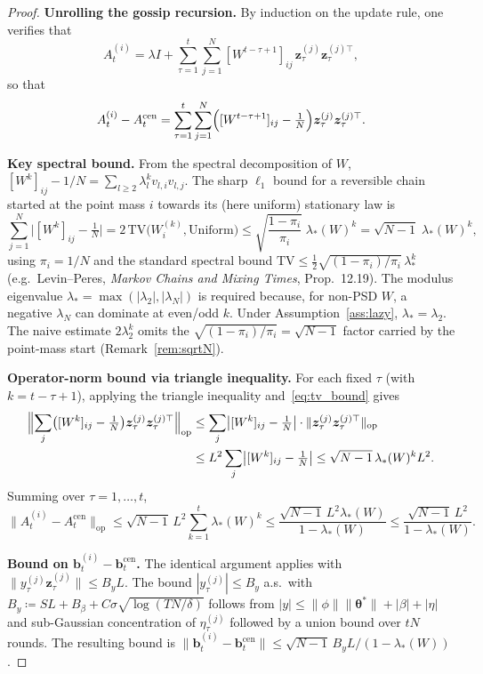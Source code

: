 \documentclass[11pt]{article}
\begin{document}
\begin{proof}
\textbf{Unrolling the gossip recursion.}
By induction on the update rule, one verifies that
\[
A_t^{(i)}=\lambda I+\sum_{\tau=1}^t\sum_{j=1}^N
[W^{t-\tau+1}]_{ij}\,\bm{z}_\tau^{(j)}\bm{z}_\tau^{(j)\top},
\]
so that
\[
A_t^{(i)}-A_t^{\mathrm{cen}}
=\sum_{\tau=1}^t\sum_{j=1}^N
\Bigl([W^{t-\tau+1}]_{ij}-\tfrac{1}{N}\Bigr)
\bm{z}_\tau^{(j)}\bm{z}_\tau^{(j)\top}.
\]

\textbf{Key spectral bound.}
From the spectral decomposition of $W$,
$[W^k]_{ij}-1/N=\sum_{l\geq 2}\lambda_l^k v_{l,i}v_{l,j}$.
The sharp $\ell_1$ bound for a reversible chain started at the point
mass $i$ towards its (here uniform) stationary law is
\begin{equation}
\sum_{j=1}^N\bigl|[W^k]_{ij}-\tfrac{1}{N}\bigr|
=2\,\mathrm{TV}\!\bigl(W_i^{(k)},\mathrm{Uniform}\bigr)
\leq\sqrt{\frac{1-\pi_i}{\pi_i}}\;\lambda_*(W)^k
=\sqrt{N-1}\;\lambda_*(W)^k,
\label{eq:tv_bound}
\end{equation}
using $\pi_i=1/N$ and the standard spectral bound
$\mathrm{TV}\leq\tfrac12\sqrt{(1-\pi_i)/\pi_i}\,\lambda_*^k$ (e.g.\
Levin--Peres, \emph{Markov Chains and Mixing Times}, Prop.~12.19).
The modulus eigenvalue $\lambda_*=\max(|\lambda_2|,|\lambda_N|)$ is
required because, for non-PSD $W$, a negative $\lambda_N$ can dominate
at even/odd $k$. Under Assumption~\ref{ass:lazy}, $\lambda_*=\lambda_2$.
The naive estimate $2\lambda_2^k$ omits the
$\sqrt{(1-\pi_i)/\pi_i}=\sqrt{N-1}$ factor carried by the point-mass
start (Remark~\ref{rem:sqrtN}).

\textbf{Operator-norm bound via triangle inequality.}
For each fixed $\tau$ (with $k=t-\tau+1$), applying the triangle
inequality and~\eqref{eq:tv_bound} gives
\begin{align*}
\Bigl\|\sum_{j}\bigl([W^k]_{ij}-\tfrac{1}{N}\bigr)
\bm{z}_\tau^{(j)}\bm{z}_\tau^{(j)\top}\Bigr\|_{\mathrm{op}}
&\leq\sum_{j}\bigl|[W^k]_{ij}-\tfrac{1}{N}\bigr|\cdot
\|\bm{z}_\tau^{(j)}\bm{z}_\tau^{(j)\top}\|_{\mathrm{op}}\\
&\leq L^2\sum_{j}\bigl|[W^k]_{ij}-\tfrac{1}{N}\bigr|
\leq\sqrt{N-1}\,\lambda_*(W)^k L^2.
\end{align*}
Summing over $\tau=1,\dots,t$,
\[
\|A_t^{(i)}-A_t^{\mathrm{cen}}\|_{\mathrm{op}}
\leq\sqrt{N-1}\,L^2\sum_{k=1}^t\lambda_*(W)^k
\leq\frac{\sqrt{N-1}\,L^2\lambda_*(W)}{1-\lambda_*(W)}
\leq\frac{\sqrt{N-1}\,L^2}{1-\lambda_*(W)}.
\]

\textbf{Bound on $\bm{b}_t^{(i)}-\bm{b}_t^{\mathrm{cen}}$.}
The identical argument applies with
$\|y_\tau^{(j)}\bm{z}_\tau^{(j)}\|\leq B_y L$.
The bound $|y_\tau^{(j)}|\leq B_y$ a.s.\ with
$B_y\coloneqq SL+B_\beta+C\sigma\sqrt{\log(TN/\delta)}$
follows from $|y|\leq\|\phi\|\|\bm{\theta}^{\!*}\|+|\beta|+|\eta|$
and sub-Gaussian concentration of $\eta_\tau^{(j)}$ followed by a
union bound over $tN$ rounds.  The resulting bound is
$\|\bm{b}_t^{(i)}-\bm{b}_t^{\mathrm{cen}}\|\leq
\sqrt{N-1}\,B_y L/(1-\lambda_*(W))$.
\end{proof}
\end{document}
